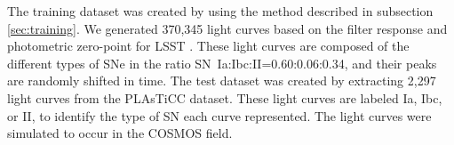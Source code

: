 \documentclass[useamsfonts]{pasj01}
\begin{document}
The training dataset was created by using the method described in subsection \ref{sec:training}. We generated 370,345 light curves based on the filter response and photometric zero-point for LSST \citep{ivezic19a}.
These light curves are composed of the different types of SNe in the ratio SN~Ia:Ibc:II=0.60:0.06:0.34, and their peaks are randomly shifted in time. 
%
The test dataset was created by extracting 2,297 light curves from the PLAsTiCC dataset.
These light curves are labeled Ia, Ibc, or II, to identify the type of SN each curve represented. The light curves were simulated to occur in the COSMOS field.
\end{document}
